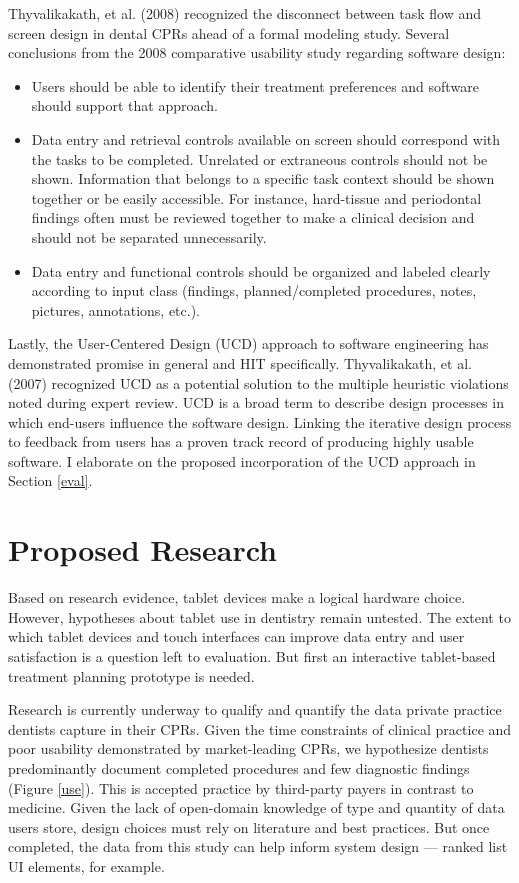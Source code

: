 \documentclass[11pt]{article}
\begin{document}
Thyvalikakath, et al. (2008) recognized the disconnect between task flow and screen design in dental CPRs ahead of a formal modeling study. Several conclusions from the 2008 comparative usability study regarding software design: \begin{itemize}
\item Users should be able to identify their treatment preferences and software should support that approach.
\item Data entry and retrieval controls available on screen should correspond with the tasks to be completed. Unrelated or extraneous controls should not be shown. Information that belongs to a specific task context should be shown together or be easily accessible. For instance, hard-tissue and periodontal findings often must be reviewed together to make a clinical decision and should not be separated unnecessarily.
\item Data entry and functional controls should be organized and labeled clearly according to input class (findings, planned/completed procedures, notes, pictures, annotations, etc.).
\end{itemize}

Lastly, the User-Centered Design (UCD) approach to software engineering has demonstrated promise in general\cite{Bannon1986Issues-in-desig,Wixon1997The-usability-e,Gould1997How-to-design-u,Abras2004Encycolopeida-o} and HIT specifically\cite{Johnson2005A-user-centered}. Thyvalikakath, et al. (2007) recognized UCD as a potential solution to the multiple heuristic violations noted during expert review. UCD is a broad term to describe design processes in which end-users influence the software design. Linking the iterative design process to feedback from users has a proven track record of producing highly usable software. I elaborate on the proposed incorporation of the UCD approach in Section \ref{eval}.

\section{Proposed Research}
Based on research evidence, tablet devices make a logical hardware choice. However, hypotheses about tablet use in dentistry remain untested. The extent to which tablet devices and touch interfaces can improve data entry and user satisfaction is a question left to evaluation. But first an interactive tablet-based treatment planning prototype is needed.

Research is currently underway to qualify and quantify the data private practice dentists capture in their CPRs. Given the time constraints of clinical practice and poor usability demonstrated by market-leading CPRs, we hypothesize dentists predominantly document completed procedures and few diagnostic findings (Figure \ref{use}). This is accepted practice by third-party payers in contrast to medicine. Given the lack of open-domain knowledge of type and quantity of data users store, design choices must rely on literature and best practices. But once completed, the data from this study can help inform system design --- ranked list UI elements, for example.
\end{document}
